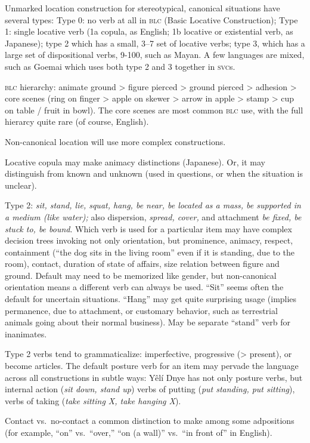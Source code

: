 \documentclass[11pt]{article}
\newcommand{\I}[1]{\textsc{#1}}   %
\begin{document}
Unmarked location construction for stereotypical, canonical situations
have several types: Type 0: no verb at all in \I{blc} (Basic Locative
Construction); Type 1: single locative verb (1a copula, as English; 1b
locative or existential verb, as Japanese); type 2 which has a small,
3--7 set of locative verbs; type 3, which has a large set of
dispositional verbs, 9-100, such as Mayan.  A few languages are mixed,
such as Goemai which uses both type 2 and 3 together in \I{svc}s.

\I{blc} hierarchy: animate ground > figure pierced > ground pierced >
adhesion > core scenes (ring on finger > apple on skewer > arrow in
apple > stamp > cup on table / fruit in bowl).  The core scenes are
most common \I{blc} use, with the full hierarcy quite rare (of course,
English).

Non-canonical location will use more complex constructions.  

Locative copula may make animacy distinctions (Japanese).  Or, it may
distinguish from known and unknown (used in questions, or when the
situation is unclear).

Type 2: \textit{sit, stand, lie, squat, hang, be near, be located as a
mass, be supported in a medium (like water);} also dispersion,
\textit{spread, cover,} and attachment \textit{be fixed, be stuck to,
be bound}.  Which verb is used for a particular item may have
complex decision trees invoking not only orientation, but
prominence, animacy, respect, containment (``the dog sits in the
living room'' even if it is standing, due to the room), contact,
duration of state of affairs, size relation between figure and ground.
Default may need to be memorized like gender, but non-canonical
orientation means a different verb can always be used.  ``Sit'' seems
often the default for uncertain situations.  ``Hang'' may get quite
surprising usage (implies permanence, due to attachment, or customary
behavior, such as terrestrial animals going about their normal
business).  May be separate ``stand'' verb for inanimates.

Type 2 verbs tend to grammaticalize: imperfective, progressive (>
present), or become articles.  The default posture verb for an item
may pervade the language across all constructions in subtle ways: Yêlí
Dnye has not only posture verbs, but internal action (\textit{sit
down, stand up}) verbs of putting (\textit{put standing, put
sitting}), verbs of taking (\textit{take sitting X, take hanging
X}).

Contact vs.\ no-contact a common distinction to make among some
adpositions (for example, ``on'' vs.\ ``over,'' ``on (a wall)''
vs.\ ``in front of'' in English).
\end{document}
